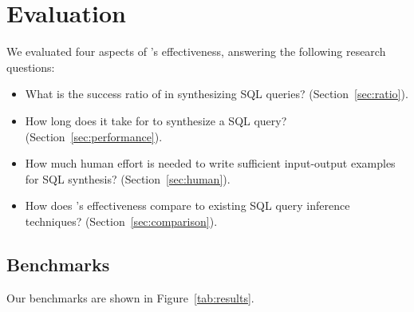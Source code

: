


\section{Evaluation}
\label{sec:evaluation}
\vspace{-1mm}


We evaluated four aspects of \ourtool's effectiveness,
answering the following research questions:

\begin{itemize}
\item What is the success ratio of \ourtool in synthesizing
SQL queries? (Section~\ref{sec:ratio}).
\item How long does it take for \ourtool to
synthesize a SQL query? (Section~\ref{sec:performance}).
\item How much human effort is needed to write sufficient
input-output examples for SQL synthesis? (Section~\ref{sec:human}).
\item How does \ourtool's effectiveness compare to
existing SQL query inference techniques? (Section~\ref{sec:comparison}).
\end{itemize}





\vspace{-1mm}
\subsection{Benchmarks}
\vspace{-1mm}


Our benchmarks are shown in Figure~\ref{tab:results}.


